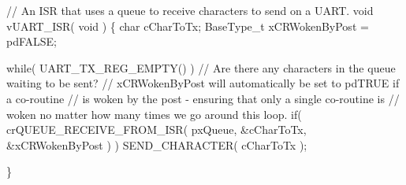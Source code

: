 \begin{DoxyPre}// An ISR that uses a queue to receive characters to send on a UART.
void vUART\_ISR( void )
\{
char cCharToTx;
BaseType\_t xCRWokenByPost = pdFALSE;
\begin{DoxyVerb}while( UART_TX_REG_EMPTY() )
{
    // Are there any characters in the queue waiting to be sent?
 // xCRWokenByPost will automatically be set to pdTRUE if a co-routine
 // is woken by the post - ensuring that only a single co-routine is
 // woken no matter how many times we go around this loop.
    if( crQUEUE_RECEIVE_FROM_ISR( pxQueue, &cCharToTx, &xCRWokenByPost ) )
 {
     SEND_CHARACTER( cCharToTx );
 }
}
\end{DoxyVerb}

\}\end{DoxyPre}
 